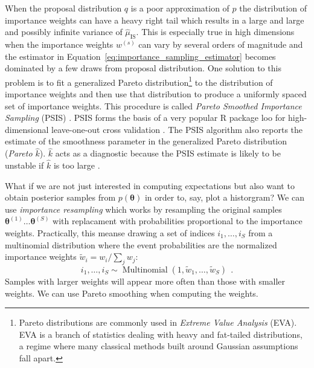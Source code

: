 \documentclass[12pt,dvipsnames]{report}
\renewcommand{\vec}[1]{\boldsymbol{\mathbf{#1}}}
\newcommand{\hquad}{~~}
\begin{document}
When the proposal distribution $q$ is a poor approximation of $p$ the distribution of 
importance weights can have a heavy right tail which results in a large and 
large and possibly infinite variance of $\hat{\mu}_{\mathrm{IS}}$.
This is especially true in high dimensions when the importance weights $w^{(s)}$ can 
vary by several orders of magnitude and the estimator in 
Equation~\ref{eq:importance_sampling_estimator} becomes dominated by a few draws from 
proposal distribution. One solution to this  problem is to fit a generalized 
Pareto distribution\footnote{Pareto distributions are commonly used in \textsl{Extreme 
Value Analysis} (EVA). EVA is a branch of statistics dealing with heavy and fat-tailed 
distributions, a regime where many classical methods built around Gaussian assumptions 
fall apart.} 
to the distribution of importance weights and then use that distribution to produce 
a uniformly spaced set of importance weights. This procedure is called 
\textsl{Pareto Smoothed Importance Sampling} (PSIS) \citep{arXiv:1507.02646}.
PSIS forms the basis of a very popular \textsf{R} package \textsf{loo} for 
high-dimensional leave-one-out cross validation \citep{arXiv:1507.04544}.
The PSIS algorithm also reports the estimate of the smoothness parameter in the
generalized Pareto distribution (\textsl{Pareto $\hat{k}$}). $\hat{k}$ acts as a 
diagnostic  because the PSIS estimate is likely to be unstable  if $\hat{k}$ is 
too large \citep{arXiv:1507.02646}.

What if we are not just interested in computing expectations but also want to obtain 
posterior samples from $p(\vec{\theta})$ in order to, say, plot a historgram? We can 
use \textsl{importance resampling} which works by resampling the original samples 
$\vec{\theta}^{(1)} \dots \vec{\theta}^{(S)}$
with replacament with probabilities proportional to  the importance weights.
Practically, this meanse drawing a set of indices $i_1, \dots, i_S$ from a 
multinomial distribution  where the event probabilities are the normalized importance 
weights $\tilde{w}_{i}=w_{i} / \sum_{j} w_{j}$:
\begin{equation}
i_{1}, \ldots, i_{S} \sim \operatorname{Multinomial}\left(1, \tilde{w}_{1}, \ldots, \tilde{w}_{S}\right)\hquad .
\end{equation}
Samples with larger weights will appear more often than those with smaller weights. 
We can use Pareto smoothing when computing the weights. 
\end{document}
